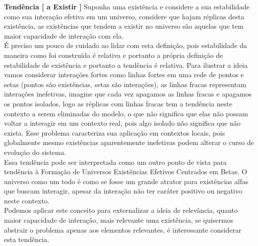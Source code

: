 \documentclass[10pt,a4paper]{report}
\begin{document}
\textbf{Tendência [ a Existir ]} Suponha uma existência e considere a sua estabilidade como sua interação efetiva em um universo, considere que hajam réplicas desta existência, as existências que tendem a existir no universo são aquelas que tem maior capacidade de interação com ela.\\

É preciso um pouco de cuidado ao lidar com esta definição, pois estabilidade da maneira como foi construída é relativa e portanto a própria definição de estabilidade de existência e portanto a tendência é relativa. Para ilustrar a ideia vamos considerar interações fortes como linhas fortes em uma rede de pontos e setas (pontos são existências, setas são interações), as linhas fracas representam interações inefetivas, imagine que cada vez apagamos as linhas fracas e apagamos os pontos isolados, logo as réplicas com linhas fracas tem a tendência neste contexto a serem eliminadas do modelo, o que não significa que elas não possam voltar a interagir em um contexto real, pois algo isolado não significa que não exista. Esse problema caracteriza sua aplicação em contextos locais, pois globalmente mesmo existências aparentemente inefetivas podem alterar o curso de evolução do sistema.\\

Essa tendência pode ser interpretada como um outro ponto de vista para tendência à Formação de Universos Existências Efetivos Centrados em Betas. O universo como um todo é como se fosse um grande atrator para existências alfas que buscam interagir, apesar da interação não ter caráter positivo ou negativo neste contexto.\\

Podemos aplicar este conceito para externalizar a ideia de relevância, quanto maior capacidade de interação, mais relevante uma existência, se quisermos abstrair o problema apenas aos elementos relevantes, é interessante considerar esta tendência.






% 
\end{document}
